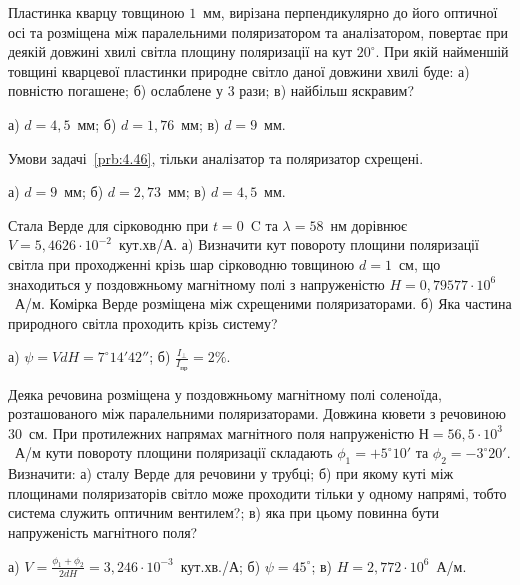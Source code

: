 \begin{problem}\label{prb:4.46}%
    Пластинка кварцу товщиною $ 1 $~мм, вирізана перпендикулярно до його
    оптичної осі та розміщена між паралельними поляризатором та
    аналізатором, повертає при деякій довжині хвилі світла площину
    поляризації на кут $ 20^\circ $. При якій найменшій товщині кварцевої
    пластинки природне світло даної довжини хвилі буде: а) повністю
    погашене; б) ослаблене у $ 3 $ рази; в) найбільш яскравим?
    \begin{solution}
        а) $ d = 4,5 $~мм; б) $ d = 1,76 $~мм; в) $ d = 9 $~мм.
    \end{solution}
\end{problem}

\begin{problem}%
    Умови задачі~\ref{prb:4.46}, тільки аналізатор та поляризатор схрещені.
    \begin{solution}
        а) $ d = 9 $~мм; б) $ d = 2,73 $~мм; в) $ d = 4,5 $~мм.
    \end{solution}
\end{problem}


\begin{problem}%
    Стала Верде для сірководню при $ t = 0 $~\textdegree C та $ \lambda = 58$~нм дорівнює $ V = 5,4626\cdot10^{-2} $~кут.хв/А. а) Визначити кут повороту площини поляризації світла при проходженні крізь шар сірководню товщиною $ d = 1 $~см, що знаходиться у поздовжньому магнітному полі з напруженістю $ H = 0,79577\cdot10^6 $~А/м. Комірка Верде розміщена між схрещеними поляризаторами. б) Яка частина природного світла проходить крізь систему?
    \begin{solution}
        а) $ \psi = VdH = 7^\circ14'42'' $; б) $ \frac{I_\perp}{I_\text{пр}} = 2\% $.
    \end{solution}
\end{problem}


\begin{problem}%
    Деяка речовина розміщена у поздовжньому магнітному полі соленоїда, розташованого між паралельними поляризаторами. Довжина кювети з речовиною $ 30 $~см. При протилежних напрямах магнітного поля напруженістю $ Н = 56,5\cdot10^3 $~А/м кути повороту площини поляризації складають $ \phi_1 = +5^\circ 10' $ та $ \phi_2 = -3^\circ 20' $. Визначити: а) сталу Верде для речовини у трубці; б) при якому куті між площинами поляризаторів світло може проходити тільки у одному напрямі, тобто система служить оптичним вентилем?; в) яка при цьому повинна бути напруженість магнітного поля?
    \begin{solution}
        а) $ V = \frac{\phi_1 + \phi_2}{2dH} = 3,246 \cdot 10^{-3}$~кут.хв./А; б) $ \psi = 45^\circ $; в) $ H = 2,772\cdot10^6 $~А/м.
    \end{solution}
\end{problem}



